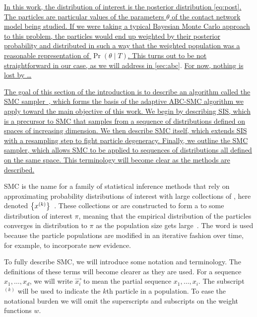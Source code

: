 {\uline{In this work, the distribution of interest is the posterior distribution
\ref{eq:post}. The particles are particular values of the parameters $\theta$
of the contact network model being studied. If we were taking a typical
Bayesian Monte Carlo approach to this problem, the particles would end up
weighted by their posterior probability and distributed in such a way that the
weighted population was a reasonable representation of $\Pr(\theta \mid T)$.
This turns out to be not straightforward in our case, as we will address in
}\cref{sec:abc}. \uline{For now, nothing is lost by \ldots}}

{\color{blue}\uline{
The goal of this section of the introduction is to describe an algorithm called
the \gls{SMC} sampler~\autocite{del2006sequential}, which forms the basis of
the adaptive \gls{ABC}-\gls{SMC} algorithm we apply toward the main objective
of this work. We begin by describing \gls{SIS}, which is a precursor to
\gls{SMC} that samples from a sequence of distributions defined on spaces of
increasing dimension. We then describe \gls{SMC} itself, which extends
\gls{SIS} with a resampling step to fight particle degeneracy. Finally, we
outline the \gls{SMC} sampler, which allows \gls{SMC} to be applied to
sequences of distributions all defined on the same space. This terminology will
become clear as the methods are described.
}}

\Gls{SMC} is the name for a family of statistical inference methods that rely
on approximating probability distributions of interest with large collections
of , here denoted
$\left\lbrace x^{(k)}\right\rbrace$~\autocite{doucet2000sequential, doucet2001introduction,
liu2008monte}. These collections or  are constructed to form
a  to some distribution of interest $\pi$,
meaning that the empirical distribution of the particles converges in
distribution to $\pi$ as the population size gets
large~\autocite{liu2001theoretical}. The word  is used because
the particle populations are modified in an iterative fashion over time, for
example, to incorporate new evidence. 

To fully describe \gls{SMC}, we will introduce some notation and terminology.
The definitions of these terms will become clearer as they are used. For a
sequence $x_1, \ldots, x_d$, we will write $\vec{x_i}$ to mean the partial
sequence $x_1, \ldots, x_i$. The subscript $^{(k)}$ will be used to indicate
the $k$th particle in a population. To ease the notational burden we will omit
the superscripts and subscripts on the weight functions $w$.

